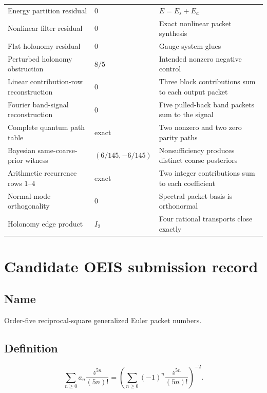 \documentclass[11pt,oneside]{book}
\theoremstyle{definition}
\theoremstyle{remark}
\begin{document}
\begin{longtable}{L{2.15in}L{1.15in}L{2.75in}}
Energy partition residual & $0$ & $E=E_s+E_a$ \\
Nonlinear filter residual & $0$ & Exact nonlinear packet synthesis \\
Flat holonomy residual & $0$ & Gauge system glues \\
Perturbed holonomy obstruction & $8/5$ & Intended nonzero negative control \\
Linear contribution-row reconstruction & $0$ & Three block contributions sum to each output packet \\
Fourier band-signal reconstruction & $0$ & Five pulled-back band packets sum to the signal \\
Complete quantum path table & exact & Two nonzero and two zero parity paths \\
Bayesian same-coarse-prior witness & $(6/145,-6/145)$ & Nonsufficiency produces distinct coarse posteriors \\
Arithmetic recurrence rows $1$--$4$ & exact & Two integer contributions sum to each coefficient \\
Normal-mode orthogonality & $0$ & Spectral packet basis is orthonormal \\
Holonomy edge product & $I_2$ & Four rational transports close exactly \\
\bottomrule
\end{longtable}

\chapter{Candidate OEIS submission record}
\section*{Name}
Order-five reciprocal-square generalized Euler packet numbers.

\section*{Definition}
\[
\sum_{n\ge0}a_n\frac{z^{5n}}{(5n)!}
=
\left(
\sum_{n\ge0}(-1)^n\frac{z^{5n}}{(5n)!}
\right)^{-2}.
\]
\end{document}
